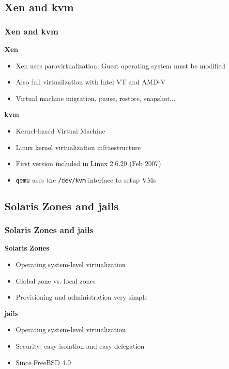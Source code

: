 \documentclass{beamer}
\begin{document}
  
  \subsection{Xen and kvm}
  \begin{frame}
    \frametitle{Xen and kvm}
    \textbf{Xen}
    \begin{itemize}
      \item Xen uses paravirtualization. Guest operating system must be modified
      \item Also full virtualization with Intel VT and AMD-V
      \item Virtual machine migration, pause, restore, snapshot...
    \end{itemize}
    \textbf{kvm}
    \begin{itemize}
      \item Kernel-based Virtual Machine
      \item Linux kernel virtualization infraestructure
      \item First version included in Linux 2.6.20 (Feb 2007)
      \item \texttt{qemu} uses the \texttt{/dev/kvm} interface to setup VMs
    \end{itemize}
  \end{frame}
  
  \subsection{Solaris Zones and jails}
  \begin{frame}
    \frametitle{Solaris Zones and jails}
    \textbf{Solaris Zones}
    \begin{itemize}
      \item Operating system-level virtualization
      \item Global zone vs. local zones
      \item Provisioning and administration very simple
    \end{itemize}
    \textbf{jails}
    \begin{itemize}
      \item Operating system-level virtualization
      \item Security: easy isolation and easy delegation
      \item Since FreeBSD 4.0
    \end{itemize}
  \end{frame}
  
\end{document}

